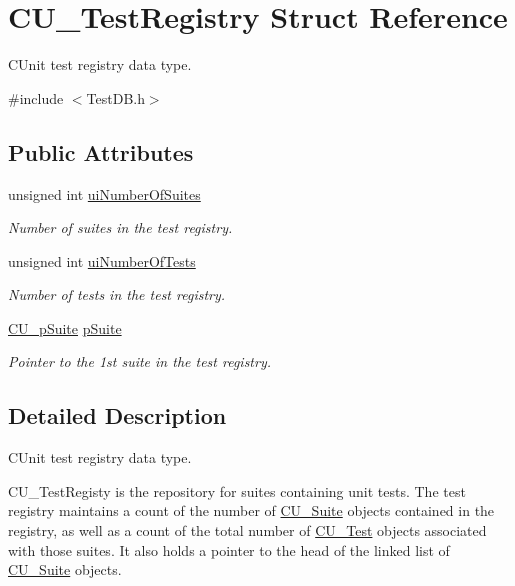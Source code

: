 \hypertarget{struct_c_u___test_registry}{\section{C\+U\+\_\+\+Test\+Registry Struct Reference}
\label{struct_c_u___test_registry}
}


C\+Unit test registry data type.  




{\ttfamily \#include $<$Test\+D\+B.\+h$>$}

\subsection*{Public Attributes}
\begin{DoxyCompactItemize}
\item 
unsigned int \hyperlink{struct_c_u___test_registry_aed4b67b99d6e0c875bcf08e924a82d68}{ui\+Number\+Of\+Suites}
\begin{DoxyCompactList}\small\item\em Number of suites in the test registry. \end{DoxyCompactList}\item 
unsigned int \hyperlink{struct_c_u___test_registry_a2ecdcc62de28e626fd55d8dc903df06c}{ui\+Number\+Of\+Tests}
\begin{DoxyCompactList}\small\item\em Number of tests in the test registry. \end{DoxyCompactList}\item 
\hyperlink{group___framework_gaba832ae8b235f5e70d6a4ac9c3bb1219}{C\+U\+\_\+p\+Suite} \hyperlink{struct_c_u___test_registry_ad58e6cd1dd4e6579eb255265593b9da8}{p\+Suite}
\begin{DoxyCompactList}\small\item\em Pointer to the 1st suite in the test registry. \end{DoxyCompactList}\end{DoxyCompactItemize}


\subsection{Detailed Description}
C\+Unit test registry data type. 

C\+U\+\_\+\+Test\+Registy is the repository for suites containing unit tests. The test registry maintains a count of the number of \hyperlink{struct_c_u___suite}{C\+U\+\_\+\+Suite} objects contained in the registry, as well as a count of the total number of \hyperlink{struct_c_u___test}{C\+U\+\_\+\+Test} objects associated with those suites. It also holds a pointer to the head of the linked list of \hyperlink{struct_c_u___suite}{C\+U\+\_\+\+Suite} objects. 

